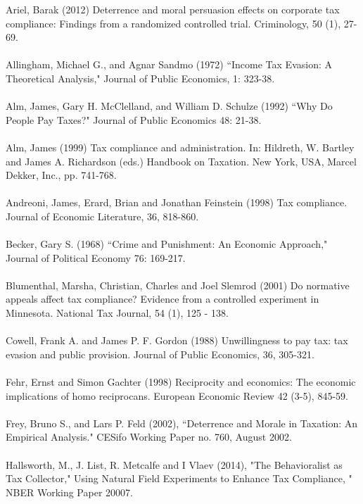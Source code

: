 \documentclass[12pt,titlepage]{article}
\begin{document}
Ariel, Barak (2012) Deterrence and moral persuasion effects on corporate tax compliance: Findings from a
randomized controlled trial. Criminology, 50 (1), 27-69. \\
\\
Allingham, Michael G., and Agnar Sandmo (1972) ``Income Tax Evasion: A Theoretical
Analysis," Journal of Public Economics, 1: 323-38. \\
\\
Alm, James, Gary H. McClelland, and William D. Schulze (1992) ``Why Do People
Pay Taxes?" Journal of Public Economics 48: 21-38. \\
\\
Alm, James (1999) Tax compliance and administration. In: Hildreth, W. Bartley and James A. Richardson
(eds.) Handbook on Taxation. New York, USA, Marcel Dekker, Inc., pp. 741-768. \\
\\
Andreoni, James, Erard, Brian and Jonathan Feinstein (1998) Tax compliance. Journal of Economic
Literature, 36, 818-860. \\
\\
Becker, Gary S. (1968) ``Crime and Punishment: An Economic Approach,"
Journal of Political Economy 76: 169-217.\\
\\
Blumenthal, Marsha, Christian, Charles and Joel Slemrod (2001) Do normative appeals affect tax
compliance? Evidence from a controlled experiment in Minnesota. National Tax Journal, 54 (1),
125 - 138. \\
\\
Cowell, Frank A. and James P. F. Gordon (1988) Unwillingness to pay tax: tax evasion and public provision.
Journal of Public Economics, 36, 305-321.\\
\\
Fehr, Ernst and Simon Gachter (1998) Reciprocity and economics: The economic implications of homo
reciprocans. European Economic Review 42 (3-5), 845-59. \\
\\
Frey, Bruno S., and Lars P. Feld (2002),  ``Deterrence and Morale in Taxation: An
Empirical Analysis." CESifo Working Paper no. 760, August 2002. \\
\\
Hallsworth, M., J. List, R. Metcalfe and I Vlaev (2014), "The Behavioralist as Tax Collector,"
Using Natural Field Experiments to Enhance Tax Compliance, " NBER Working Paper 20007. \\
\\
\end{document}
